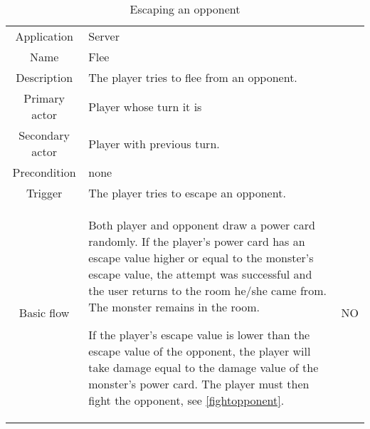 \begin{table}
\caption{Escaping an opponent}
\label{escape}
\begin{tabular}{|c| p{9cm}|c}
\hline
Application & Server & \\
Name & Flee & \\
Description & The player tries to flee from an opponent. & \\
Primary actor & Player whose turn it is & \\
Secondary actor & Player with previous turn. & \\
Precondition & none & \\
Trigger & The player tries to escape an opponent. & \\ \hline
Basic flow & Both player and opponent draw a power card randomly. If the player's power card has an escape value higher or equal to the monster's escape value, the attempt was successful and the user returns to the room he/she came from. The monster remains in the room. 

If the player's escape value is lower than the escape value of the opponent, the player will take damage equal to the damage value of the monster's power card. The player must then fight the opponent, see \ref{fightopponent}.
& NO \\

\hline
\end{tabular}
\end{table}



